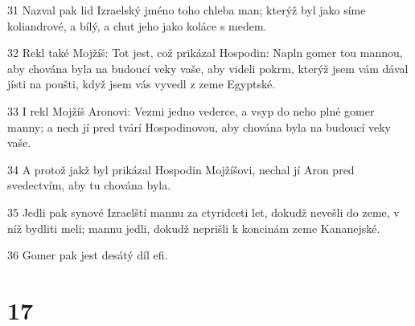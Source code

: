 \par 31 Nazval pak lid Izraelský jméno toho chleba man; kterýž byl jako síme koliandrové, a bílý, a chut jeho jako koláce s medem.
\par 32 Rekl také Mojžíš: Tot jest, což prikázal Hospodin: Napln gomer tou mannou, aby chována byla na budoucí veky vaše, aby videli pokrm, kterýž jsem vám dával jísti na poušti, když jsem vás vyvedl z zeme Egyptské.
\par 33 I rekl Mojžíš Aronovi: Vezmi jedno vederce, a vsyp do neho plné gomer manny; a nech jí pred tvárí Hospodinovou, aby chována byla na budoucí veky vaše.
\par 34 A protož jakž byl prikázal Hospodin Mojžíšovi, nechal jí Aron pred svedectvím, aby tu chována byla.
\par 35 Jedli pak synové Izraelští mannu za ctyridceti let, dokudž nevešli do zeme, v níž bydliti meli; mannu jedli, dokudž neprišli k koncinám zeme Kananejské.
\par 36 Gomer pak jest desátý díl efi.

\chapter{17}

